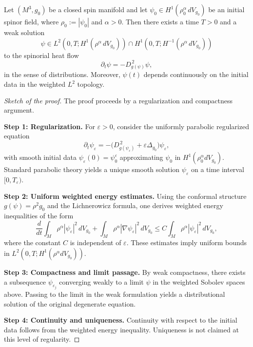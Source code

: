 \documentclass[10pt,a4paper]{amsart}
\begin{document}
\begin{theorem}
Let $(M^3,g_0)$ be a closed spin manifold and let
$\psi_0 \in H^1(\rho_0^\alpha\, dV_{g_0})$ be an initial spinor field,
where $\rho_0 := |\psi_0|$ and $\alpha>0$.
Then there exists a time $T>0$ and a weak solution
\[
\psi \in L^2(0,T; H^1(\rho^\alpha\, dV_{g_0})) \cap
H^1(0,T; H^{-1}(\rho^\alpha\, dV_{g_0}))
\]
to the spinorial heat flow
\[
\partial_t \psi = - D_{g(\psi)}^{\,2}\psi,
\]
in the sense of distributions.
Moreover, $\psi(t)$ depends continuously on the initial data in the
weighted $L^2$ topology.
\end{theorem}

\begin{proof}[Sketch of the proof]
The proof proceeds by a regularization and compactness argument.

\medskip
\noindent
\textbf{Step 1: Regularization.}
For $\varepsilon>0$, consider the uniformly parabolic regularized equation
\[
\partial_t \psi_\varepsilon
= -\big(D_{g(\psi_\varepsilon)}^{\,2} + \varepsilon \Delta_{g_0}\big)\psi_\varepsilon,
\]
with smooth initial data $\psi_{\varepsilon}(0)=\psi_0^\varepsilon$
approximating $\psi_0$ in $H^1(\rho_0^\alpha dV_{g_0})$.
Standard parabolic theory yields a unique smooth solution
$\psi_\varepsilon$ on a time interval $[0,T_\varepsilon)$.

\medskip
\noindent
\textbf{Step 2: Uniform weighted energy estimates.}
Using the conformal structure $g(\psi)=\rho^2 g_0$ and the Lichnerowicz formula,
one derives weighted energy inequalities of the form
\[
\frac{d}{dt}\int_M \rho^\alpha |\psi_\varepsilon|^2\, dV_{g_0}
+ \int_M \rho^\alpha |\nabla \psi_\varepsilon|^2\, dV_{g_0}
\le C \int_M \rho^\alpha |\psi_\varepsilon|^2\, dV_{g_0},
\]
where the constant $C$ is independent of $\varepsilon$.
These estimates imply uniform bounds in
$L^2(0,T; H^1(\rho^\alpha dV_{g_0}))$.

\medskip
\noindent
\textbf{Step 3: Compactness and limit passage.}
By weak compactness, there exists a subsequence $\psi_{\varepsilon_j}$
converging weakly to a limit $\psi$ in the weighted Sobolev spaces above.
Passing to the limit in the weak formulation yields a distributional
solution of the original degenerate equation.

\medskip
\noindent
\textbf{Step 4: Continuity and uniqueness.}
Continuity with respect to the initial data follows from the weighted
energy inequality.
Uniqueness is not claimed at this level of regularity.
\end{proof}
\end{document}
